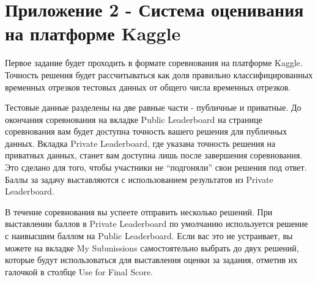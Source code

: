 \section*{Приложение 2 - Система оценивания на платформе Kaggle}

Первое задание будет проходить в формате соревнования на платформе Kaggle. Точность решения будет рассчитываться как доля правильно классифицированных временных отрезков тестовых данных от общего числа временных отрезков.

Тестовые данные разделены на две равные части - публичные и приватные. До окончания соревнования на вкладке Public Leaderboard на странице соревнования вам будет доступна точность вашего решения для публичных данных. Вкладка Private Leaderboard, где указана точность решения на приватных данных, станет вам доступна лишь после завершения соревнования. Это сделано для того, чтобы участники не “подгоняли” свои решения под ответ. Баллы за задачу выставляются с использованием результатов из Private Leaderboard. 

В течение соревнования вы успеете отправить несколько решений. При выставлении баллов в Private Leaderboard по умолчанию используется решение с наивысшим баллом на Public Leaderboard. Если вас это не устраивает, вы можете на вкладке My Submissions самостоятельно выбрать до двух решений, которые будут использоваться для выставления оценки за задания, отметив их галочкой в столбце Use for Final Score.
